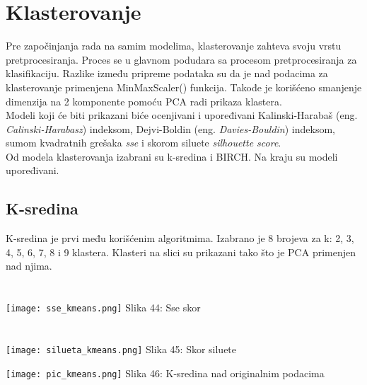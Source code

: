 \documentclass[a4paper]{article}
\begin{document}
{\section{Klasterovanje}
\label{klasterovanje}

Pre započinjanja rada na samim modelima, klasterovanje zahteva svoju vrstu pretprocesiranja. Proces se u glavnom podudara sa procesom pretprocesiranja za klasifikaciju. Razlike između pripreme podataka su da je nad podacima za klasterovanje primenjena MinMaxScaler() funkcija. Takođe je korišćeno smanjenje dimenzija na 2 komponente pomoću PCA radi prikaza klastera.\\

Modeli koji će biti prikazani biće ocenjivani i upoređivani Kalinski-Harabaš (eng. {\em Calinski-Harabasz}) indeksom, Dejvi-Boldin (eng. {\em Davies-Bouldin}) indeksom, sumom kvadratnih grešaka {\em sse} i skorom siluete {\em silhouette score}.\\

Od modela klasterovanja izabrani su k-sredina i BIRCH. Na kraju su modeli upoređivani.\\

\subsection{K-sredina}
\label{rf}

\noindent\begin{minipage}{0.4\textwidth}
K-sredina je prvi među korišćenim algoritmima. Izabrano je 8 brojeva za k: 2, 3, 4, 5, 6, 7, 8 i 9 klastera. Klasteri na slici su prikazani tako što je PCA primenjen nad njima.\\
\vphantom{a}\\
\vphantom{a}\\
\texttt{[image: sse\_kmeans.png]}
\hphantom{aaaaaaaaa}Slika 44: Sse skor\\
\vphantom{a}\\
\vphantom{a}\\
\texttt{[image: silueta\_kmeans.png]}
\hphantom{aaaaaaaa}Slika 45: Skor siluete\\
\end{minipage}
\noindent\begin{minipage}{0.05\textwidth}
\hphantom{a}
\end{minipage}
\noindent\begin{minipage}{0.48\textwidth}
\texttt{[image: pic\_kmeans.png]}
Slika 46: K-sredina nad originalnim podacima\\
\end{minipage}

}
\end{document}
